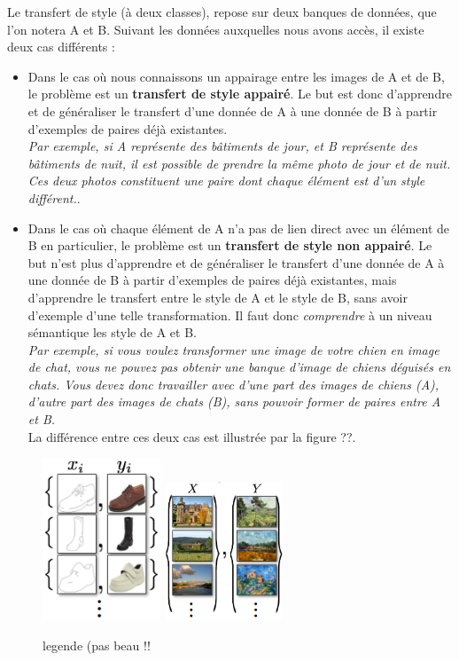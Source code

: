 Le transfert de style (à deux classes), repose sur deux banques de données, que l'on notera A et B. Suivant les données auxquelles nous avons accès, il existe deux cas différents :
\begin{itemize}
  \item Dans le cas où nous connaissons un appairage entre les images de A et de B, le problème est un \textbf{transfert de style appairé}. Le but est donc d'apprendre et de généraliser le transfert d'une donnée de A à une donnée de B à partir d'exemples de paires déjà existantes.\\
  \textit{Par exemple, si A représente des bâtiments de jour, et B représente des bâtiments de nuit, il est possible de prendre la même photo de jour et de nuit. Ces deux photos constituent une paire dont chaque élément est d'un style différent.}.
  \item Dans le cas où chaque élément de A n'a pas de lien direct avec un élément de B en particulier, le problème est un \textbf{transfert de style non appairé}. Le but n'est plus d'apprendre et de généraliser le transfert d'une donnée de A à une donnée de B à partir d'exemples de paires déjà existantes, mais d'apprendre le transfert entre le style de A et le style de B, sans avoir d'exemple d'une telle transformation. Il faut donc \textit{comprendre} à un niveau sémantique les style de A et B.\\
  \textit{Par exemple, si vous voulez transformer une image de votre chien en image de chat, vous ne pouvez pas obtenir une banque d'image de chiens déguisés en chats. Vous devez donc travailler avec d'une part des images de chiens (A), d'autre part des images de chats (B), sans pouvoir former de paires entre A et B.}\\
   La différence entre ces deux cas est illustrée par la figure ??. 
\end{itemize}

\begin{figure}[!h]
\centering
\includegraphics[width=100pt,valign=t]{"images/paire"}
\hspace*{10mm}
\includegraphics[width=100pt,valign=t]{"images/pairepas"}
\caption{legende (pas beau !!}
\end{figure}

